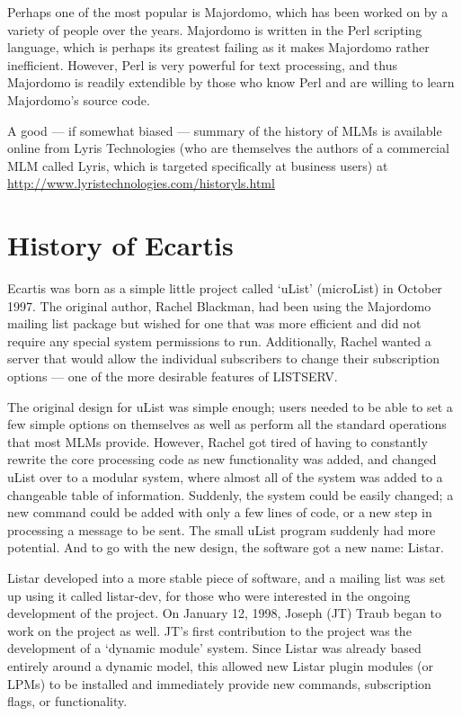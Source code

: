 \documentclass{book}
\begin{document}
Perhaps one of the most popular is Majordomo, which has been
worked on by a variety of people over the years.  Majordomo is written in the
Perl scripting language, which is perhaps its greatest failing as it makes
Majordomo rather inefficient.  However, Perl is very powerful for text
processing, and thus Majordomo is readily extendible by those who know Perl
and are willing to learn Majordomo's source code.
   
A good --- if somewhat biased --- summary of the history of MLMs is available
online from Lyris Technologies (who are themselves the authors of a commercial
MLM called Lyris, which is targeted specifically at business users) at
\href{http://www.lyristechnologies.com/historyls.html}{http://www.lyristechnologies.com/historyls.html}
   
\section{History of Ecartis}
\label{int:history:Ecartis}

Ecartis was born as a simple little project called `uList' (microList) in
October 1997.  The original author, Rachel Blackman, had been using the
Majordomo mailing list package but wished for one that was more efficient and
did not require any special system permissions to run.  Additionally, Rachel
wanted a server that would allow the individual subscribers to change their
subscription options --- one of the more desirable features of LISTSERV.
   
The original design for uList was simple enough; users needed to be able to
set a few simple options on themselves as well as perform all the standard
operations that most MLMs provide.  However, Rachel got tired of having to
constantly rewrite the core processing code as new functionality was added,
and changed uList over to a modular system, where almost all of the system was
added to a changeable table of information.  Suddenly, the system could be
easily changed; a new command could be added with only a few lines of code, or
a new step in processing a message to be sent.  The small uList program
suddenly had more potential.  And to go with the new design, the software got
a new name: Listar.
   
Listar developed into a more stable piece of software, and a mailing list was
set up using it called listar-dev, for those who were interested in the
ongoing development of the project.  On January 12, 1998, Joseph (JT) Traub
began to work on the project as well.  JT's first contribution to the project
was the development of a `dynamic module' system.  Since Listar was already
based entirely around a dynamic model, this allowed new Listar plugin modules
(or LPMs) to be installed and immediately provide new commands, subscription
flags, or functionality.
   
\end{document}
